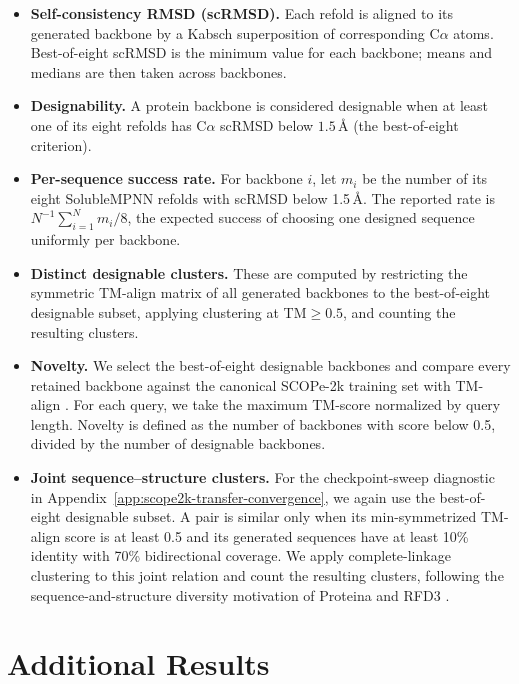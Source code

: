 \documentclass{article} %
\begin{document}
\begin{itemize}
  \item \textbf{Self-consistency RMSD (scRMSD).} Each refold is aligned to its generated backbone by a Kabsch superposition of corresponding C$\alpha$ atoms. Best-of-eight scRMSD is the minimum value for each backbone; means and medians are then taken across backbones.
  \item \textbf{Designability.} A protein backbone is considered designable
  when at least one of its eight refolds has C$\alpha$ scRMSD below
  $1.5$\,\AA{} (the best-of-eight criterion).
  \item \textbf{Per-sequence success rate.} For backbone $i$, let $m_i$
  be the number of its eight SolubleMPNN refolds with scRMSD below 1.5\,\AA.
  The reported rate is $N^{-1}\sum_{i=1}^{N}m_i/8$, the expected success of
  choosing one designed sequence uniformly per backbone.
  \item \textbf{Distinct designable clusters.} These are computed by restricting the symmetric TM-align matrix of all generated backbones to the best-of-eight designable subset, applying clustering at TM$\geq 0.5$, and counting the
  resulting clusters.
  \item \textbf{Novelty.} We select the best-of-eight designable backbones and compare
  every retained backbone against the canonical SCOPe-2k training set with
  TM-align \citep{zhang2005tmalign}. For each query, we take the maximum TM-score
  normalized by query length. Novelty is defined as the number of backbones with score below
  0.5, divided by the number of designable backbones.
  \item \textbf{Joint sequence--structure clusters.} For the checkpoint-sweep
  diagnostic in Appendix~\ref{app:scope2k-transfer-convergence}, we again use
  the best-of-eight designable subset. A pair is similar only when its
  min-symmetrized TM-align score is at least 0.5 and its generated sequences
  have at least 10\% identity with 70\% bidirectional coverage. We apply
  complete-linkage clustering to this joint relation and count the resulting
  clusters, following the sequence-and-structure diversity motivation of
  Proteina and RFD3 \citep{geffner2025proteina,butcher2025rfdiffusion3}.
\end{itemize}

\section{Additional Results}
\label{app:additional-results}
\end{document}
